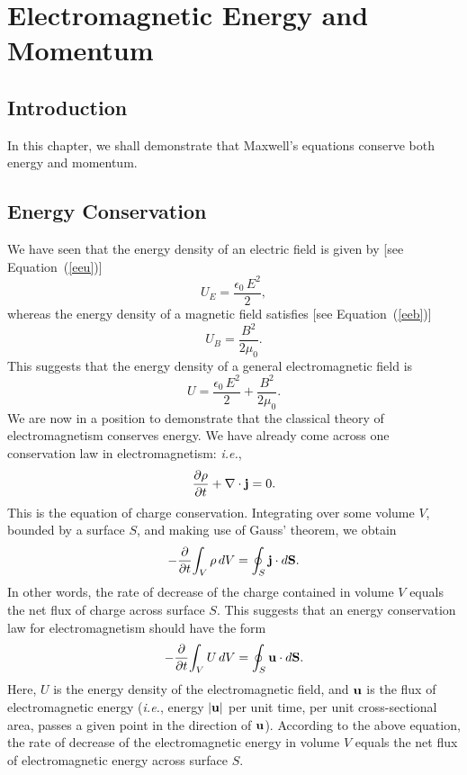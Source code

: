 \chapter{Electromagnetic Energy and Momentum}\label{energy}
\section{Introduction}
In this chapter, we shall demonstrate that Maxwell's
equations conserve both energy and momentum.

\section{Energy Conservation}\label{s8.2}
We have seen that the energy density of an electric field is given by
[see Equation~(\ref{eeu})]
\begin{equation}
U_E = \frac{\epsilon_0\,E^2}{2},
\end{equation}
whereas the energy density of a magnetic field satisfies 
[see Equation~(\ref{eeb})]
\begin{equation}
U_B = \frac{B^2}{2\mu_0}.
\end{equation}
This suggests that the energy density of a general electromagnetic field is
\begin{equation}
U= \frac{\epsilon_0\,E^2}{2}+\frac{B^2}{2\mu_0}.
\end{equation}
We are now in a position to demonstrate that the classical theory of
electromagnetism conserves energy. We have already come across one conservation
law in electromagnetism: {\em i.e.},
\begin{equation}
\frac{\partial\rho}{\partial t} +\nabla\cdot {\bf j} = 0.
\end{equation}
This is the equation of charge conservation. Integrating over some volume
$V$, bounded by a surface $S$, and making use of Gauss' theorem, we obtain
\begin{equation}
-\frac{\partial}{\partial t}\!\int_V \rho\,d V = \oint_S {\bf j}\cdot d{\bf S}.
\end{equation}
In other words, the rate of decrease of the charge contained in volume $V$ equals
the net flux of charge across surface $S$. This suggests that an energy conservation
law for electromagnetism should have the form
\begin{equation}\label{e8.6}
-\frac{\partial}{\partial t}\!\int_V U\,d V = \oint_S {\bf u}\cdot d{\bf S}.
\end{equation}
Here, $U$ is the energy density of the electromagnetic field, and ${\bf u}$ is
the flux of electromagnetic energy ({\em i.e.}, 
energy  $|{\bf u}|$ per unit time, per unit cross-sectional area, passes a given
point in the direction of ${\bf u}$). According to the above equation, the
rate of decrease of the electromagnetic energy in volume $V$ equals the net flux
of electromagnetic energy across surface $S$.

